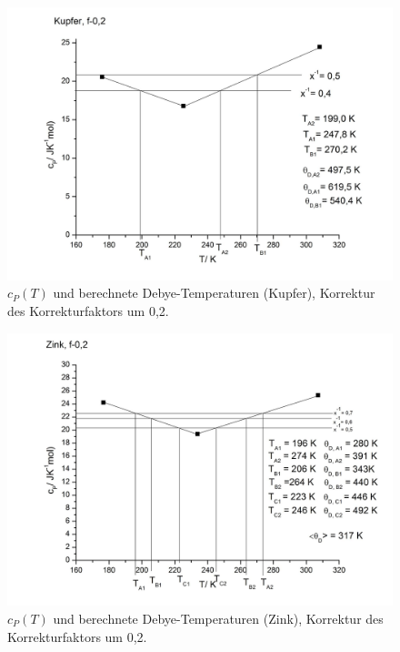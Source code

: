 \documentclass[12pt,a4paper,titlepage,headinclude,bibtotoc]{scrartcl}
\begin{document}
\begin{figure}
\includegraphics[width=13.5cm]{Cu_02.jpeg}
\caption{$c_P(T)$ und berechnete Debye-Temperaturen (Kupfer), Korrektur des Korrekturfaktors um 0,2.}
\end{figure}
\FloatBarrier
\begin{figure}
\includegraphics[width=13.5cm]{Zn_02.jpeg}
\caption{$c_P(T)$ und berechnete Debye-Temperaturen (Zink), Korrektur des Korrekturfaktors um 0,2.}
\end{figure}
\FloatBarrier
\end{document}
